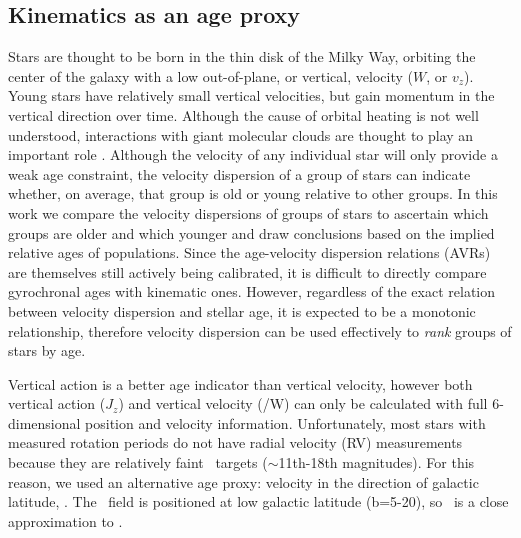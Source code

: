 \subsection{Kinematics as an age proxy}

Stars are thought to be born in the thin disk of the Milky Way, orbiting the
center of the galaxy with a low out-of-plane, or vertical, velocity ($W$, or
$v_z$).
Young stars have relatively small vertical velocities, but gain momentum in
the vertical direction over time.
Although the cause of orbital heating is not well understood, interactions
with giant molecular clouds are thought to play an important
role .
Although the velocity of any individual star will only provide a weak age
constraint, the velocity dispersion of a group of stars can indicate whether,
on average, that group is old or young relative to other groups.
In this work we compare the velocity dispersions of groups of stars to
ascertain which groups are older and which younger and draw conclusions based
on the implied relative ages of populations.
Since the age-velocity dispersion relations (AVRs) are themselves still
actively being calibrated, it is difficult to directly compare gyrochronal
ages with kinematic ones.
However, regardless of the exact relation between velocity dispersion and
stellar age, it is expected to be a monotonic relationship, therefore velocity
dispersion can be used effectively to {\it rank} groups of stars by age.

Vertical action is a better age indicator than vertical velocity, however both
vertical action ($J_z$) and vertical velocity (\vz/W) can only be calculated
with full 6-dimensional position and velocity information.
Unfortunately, most stars with measured rotation periods do not have radial
velocity (RV) measurements because they are relatively faint \kepler\ targets
($\sim$11th-18th magnitudes).
For this reason, we used an alternative age proxy: velocity in the direction
of galactic latitude, \vb.
The \kepler\ field is positioned at low galactic latitude (b=5-20\degrees), so
\vb\ is a close approximation to \vz.


